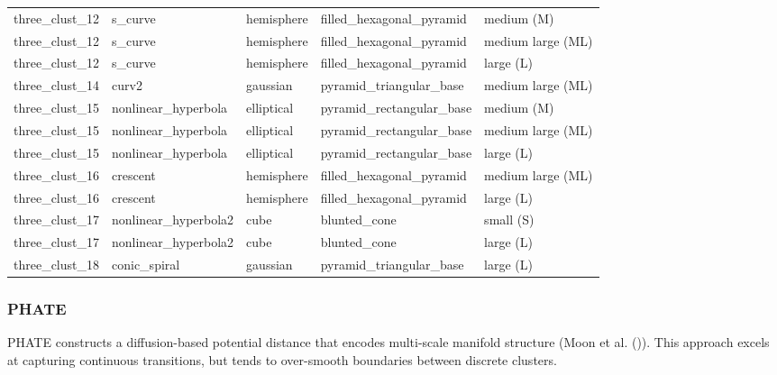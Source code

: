 \documentclass[
  11pt,
  a4paper,
]{report}
\begin{document}
\begin{table}
{\begin{tabular}{lllll}
three\_clust\_12 & s\_curve & hemisphere & filled\_hexagonal\_pyramid & medium (M)\\
three\_clust\_12 & s\_curve & hemisphere & filled\_hexagonal\_pyramid & medium large (ML)\\
three\_clust\_12 & s\_curve & hemisphere & filled\_hexagonal\_pyramid & large (L)\\
three\_clust\_14 & curv2 & gaussian & pyramid\_triangular\_base & medium large (ML)\\
three\_clust\_15 & nonlinear\_hyperbola & elliptical & pyramid\_rectangular\_base & medium (M)\\
three\_clust\_15 & nonlinear\_hyperbola & elliptical & pyramid\_rectangular\_base & medium large (ML)\\
three\_clust\_15 & nonlinear\_hyperbola & elliptical & pyramid\_rectangular\_base & large (L)\\
three\_clust\_16 & crescent & hemisphere & filled\_hexagonal\_pyramid & medium large (ML)\\
three\_clust\_16 & crescent & hemisphere & filled\_hexagonal\_pyramid & large (L)\\
three\_clust\_17 & nonlinear\_hyperbola2 & cube & blunted\_cone & small (S)\\
three\_clust\_17 & nonlinear\_hyperbola2 & cube & blunted\_cone & large (L)\\
three\_clust\_18 & conic\_spiral & gaussian & pyramid\_triangular\_base & large (L)\\
\bottomrule
\end{tabular}}
\end{table}

\subsubsection{PHATE}\label{phate}

PHATE constructs a diffusion-based potential distance that encodes
multi-scale manifold structure (Moon et al.
()). This approach excels at capturing
continuous transitions, but tends to over-smooth boundaries between
discrete clusters.
\end{document}
